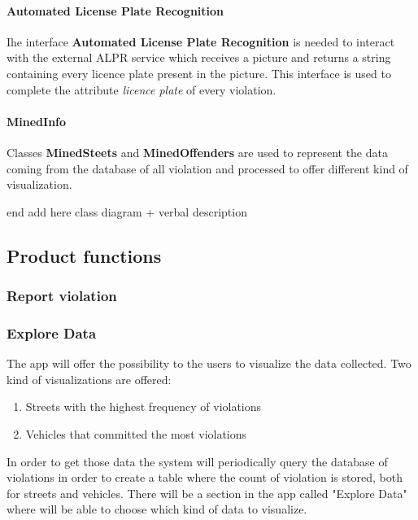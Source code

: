 \paragraph{Automated License Plate Recognition}

Ihe interface \textbf{Automated License Plate Recognition} is needed to interact with the external ALPR service which receives a picture and returns a string containing every licence plate present in the picture. This interface is used to complete the attribute \textit{licence plate} of every violation.

\paragraph{MinedInfo}

Classes \textbf{MinedSteets} and \textbf{MinedOffenders} are used to represent the data coming from the database of all violation and processed to offer different kind of visualization.






end
add here class diagram + verbal description





\subsection{Product functions}

\subsubsection{Report violation}



\subsubsection{Explore Data}
The app will offer the possibility to the users to visualize the data collected.
Two kind of visualizations are offered:
\begin{enumerate}
  \item Streets with the highest frequency of violations
  \item Vehicles that committed the most violations
\end{enumerate}
In order to get those data the system will periodically query the database of violations in order to create a table where the count of violation is stored, both for streets and vehicles.
There will be a section in the app called "Explore Data" where will be able to choose which kind of data to visualize.




